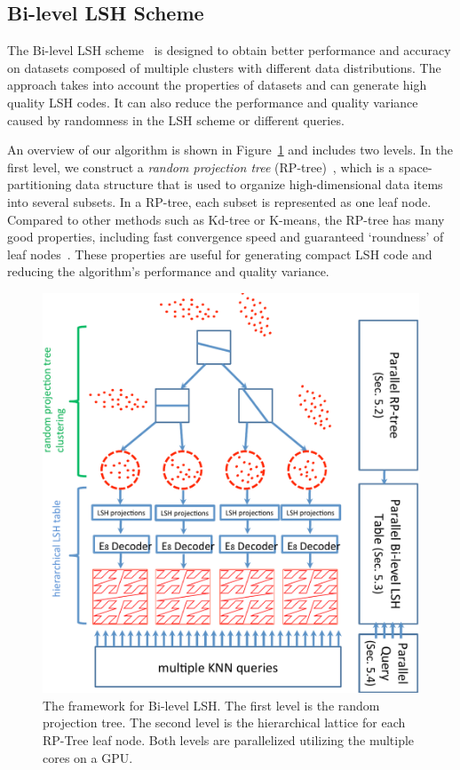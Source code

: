 \subsection{Bi-level LSH Scheme}
\label{sec:6:overview:lsh}
The Bi-level LSH scheme~\cite{BilevelLSH2011} is designed to obtain better performance and accuracy on datasets composed of multiple clusters with different data distributions. The approach takes into account the properties of datasets and can generate high quality LSH codes. It can also reduce the performance and quality variance caused by randomness in the LSH scheme or different queries.

An overview of our algorithm is shown in Figure~\ref{fig:6:overview} and includes two levels.
In the first level, we construct a \emph{random projection tree} (RP-tree)~\cite{yoav:nips:2007,Dasgupta:2008}, which is a space-partitioning data structure that is used to organize high-dimensional data items into several subsets. In a RP-tree, each subset is represented as one leaf node. Compared to other methods such as Kd-tree or K-means, the RP-tree has many good properties, including fast convergence speed and guaranteed `roundness' of leaf nodes~\cite{Dasgupta:2008,aman:nips:2010}. These properties are useful for generating compact LSH code and reducing the algorithm's performance and quality variance.
\begin{figure}[t]
  \centering
  \includegraphics[width=0.8\linewidth]{figs/6/overview.pdf}
  \caption[Bi-level LSH framework]{\label{fig:6:overview} The framework for Bi-level LSH. The first level is the random projection tree. The second level is the hierarchical lattice for each RP-Tree leaf node. Both levels are parallelized utilizing the multiple cores on a GPU. }
\end{figure}
